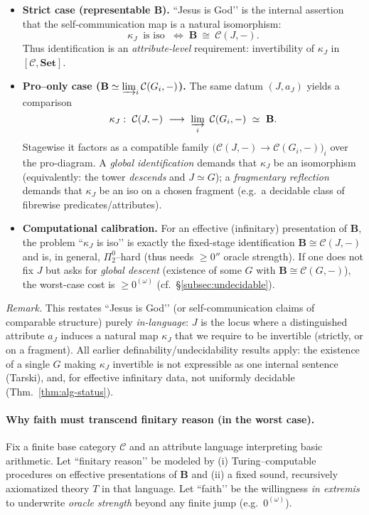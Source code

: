 \documentclass[11pt]{article}
\theoremstyle{upright}
\begin{document}
\begin{itemize}[leftmargin=2em]
\item \textbf{Strict case (representable $\mathbf B$).}
“Jesus is God’’ is the internal assertion that the self-communication map is a natural isomorphism:
\[
\kappa_J\ \text{ is iso } \;\Longleftrightarrow\; \mathbf B\ \cong\ \mathcal C(J,-).
\]
Thus identification is an \emph{attribute-level} requirement: invertibility of $\kappa_J$ in $[\mathcal C,\mathbf{Set}]$.

\item \textbf{Pro–only case ($\mathbf B\simeq \varinjlim_i \mathcal C(G_i,-)$).}
The same datum $(J,a_J)$ yields a comparison
\[
\kappa_J:\ \mathcal C(J,-)\ \longrightarrow\ \varinjlim_{i}\ \mathcal C(G_i,-)\ \simeq\ \mathbf B.
\]
Stagewise it factors as a compatible family $\big(\mathcal C(J,-)\!\to\!\mathcal C(G_i,-)\big)_i$ over the pro-diagram. 
A \emph{global identification} demands that $\kappa_J$ be an isomorphism (equivalently: the tower \emph{descends} and $J\simeq G$); 
a \emph{fragmentary reflection} demands that $\kappa_J$ be an iso on a chosen fragment (e.g.\ a decidable class of fibrewise predicates/attributes).

\item \textbf{Computational calibration.}
For an effective (infinitary) presentation of $\mathbf B$, the problem “$\kappa_J$ is iso’’ is exactly the fixed-stage identification
$\mathbf B\cong \mathcal C(J,-)$ and is, in general, $\Pi^0_2$–hard (thus needs $\ge 0''$ oracle strength). 
If one does not fix $J$ but asks for \emph{global descent} (existence of some $G$ with $\mathbf B\cong\mathcal C(G,-)$), the worst-case cost is $\ge 0^{(\omega)}$ (cf.\ \S\ref{subsec:undecidable}).
\end{itemize}

\noindent\emph{Remark.}
This restates “Jesus is God’’ (or self-communication claims of comparable structure) purely \emph{in-language}: $J$ is the locus where a distinguished attribute $a_J$ induces a natural map $\kappa_J$ that we require to be invertible (strictly, or on a fragment). 
All earlier definability/undecidability results apply: the existence of a single $G$ making $\kappa_J$ invertible is not expressible as one internal sentence (Tarski), and, for effective infinitary data, not uniformly decidable (Thm.~\ref{thm:alg-status}).

\paragraph{Why faith must transcend finitary reason (in the worst case).}
Fix a finite base category $\mathcal C$ and an attribute language interpreting basic arithmetic. 
Let “finitary reason’’ be modeled by (i) Turing–computable procedures on effective presentations of $\mathbf B$ and (ii) a fixed sound, recursively axiomatized theory $T$ in that language. 
Let “faith’’ be the willingness \emph{in extremis} to underwrite \emph{oracle strength} beyond any finite jump (e.g.\ $0^{(\omega)}$).
\end{document}
